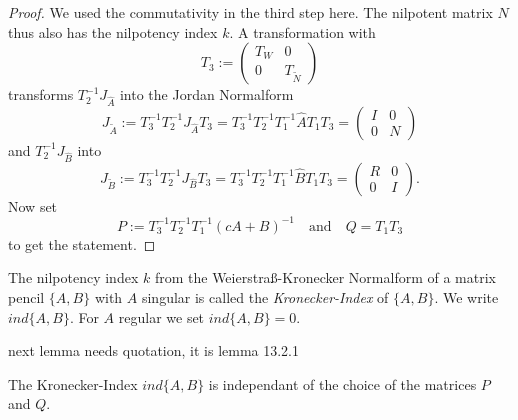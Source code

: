 \begin{proof}
	We used the commutativity in the third step here. The nilpotent matrix $N$ thus also has the nilpotency index $k$. A transformation with
	\begin{displaymath}
		T_3 := 
		\left(
		\begin{matrix}
			T_W & 0 \\
			0 & T_{\tilde{N}}
		\end{matrix}
		\right)
	\end{displaymath}
	transforms $T_2^{-1}J_{\hat{A}}$ into the Jordan Normalform
	\begin{displaymath}
		J_{\tilde{A}} := T_3^{-1}T_2^{-1}J_{\hat{A}}T_3 = T_3^{-1}T_2^{-1}T_1^{-1}\hat{A}T_1T_3 = 
		\left(
		\begin{matrix}
			I & 0 \\
			0 & N
		\end{matrix}
		\right)
	\end{displaymath}
	and $T_2^{-1}J_{\hat{B}}$ into
	\begin{displaymath}
		J_{\tilde{B}} := T_3^{-1}T_2^{-1}J_{\hat{B}}T_3 = T_3^{-1}T_2^{-1}T_1^{-1}\hat{B}T_1T_3 = 
		\left(
		\begin{matrix}
			R & 0 \\
			0 & I
		\end{matrix}
		\right) .
	\end{displaymath}
	Now set
	\begin{displaymath}
		P:= T_3^{-1}T_2^{-1}T_1^{-1}(cA+B)^{-1} \quad \text{and} \quad Q = T_1T_3
	\end{displaymath}
	to get the statement.
\end{proof}

\begin{definition}
	The nilpotency index $k$ from the Weierstraß-Kronecker Normalform of a matrix pencil $\{A,B\}$ with $A$ singular is called the \emph{Kronecker-Index} of $\{A,B\}$. We write $ind\{A,B\}$. For $A$ regular we set $ind\{A,B\} = 0$.
\end{definition}

next lemma needs quotation, it is lemma 13.2.1

\begin{lemma}
	The Kronecker-Index $ind\{A,B\}$ is independant of the choice of the matrices $P$ and $Q$.
\end{lemma}


